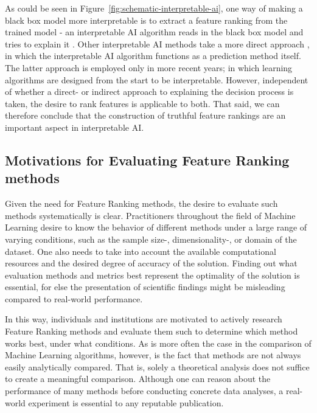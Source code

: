 \documentclass[../main.tex]{subfiles}
\begin{document}
As could be seen in Figure~\ref{fig:schematic-interpretable-ai}, one way of making a black box model more interpretable is to extract a feature ranking from the trained model - an interpretable AI algorithm reads in the black box model and tries to explain it \citep{lundberg_unified_2017}. Other interpretable AI methods take a more direct approach \citep{arik_tabnet_2020}, in which the interpretable AI algorithm functions as a prediction method itself. The latter approach is employed only in more recent years; in which learning algorithms are designed from the start to be interpretable. However, independent of whether a direct- or indirect approach to explaining the decision process is taken, the desire to rank features is applicable to both. That said, we can therefore conclude that the construction of truthful feature rankings are an important aspect in interpretable AI.




\subsection{Motivations for Evaluating Feature Ranking methods}
Given the need for Feature Ranking methods, the desire to evaluate such methods systematically is clear. Practitioners throughout the field of Machine Learning desire to know the behavior of different methods under a large range of varying conditions, such as the sample size-, dimensionality-, or domain of the dataset. One also needs to take into account the available computational resources and the desired degree of accuracy of the solution. Finding out what evaluation methods and metrics best represent the optimality of the solution is essential, for else the presentation of scientific findings might be misleading compared to real-world performance.

In this way, individuals and institutions are motivated to actively research Feature Ranking methods and evaluate them such to determine which method works best, under what conditions. As is more often the case in the comparison of Machine Learning algorithms, however, is the fact that methods are not always easily analytically compared. That is, solely a theoretical analysis does not suffice to create a meaningful comparison. Although one can reason about the performance of many methods before conducting concrete data analyses, a real-world experiment is essential to any reputable publication.



\biblio
\end{document}
